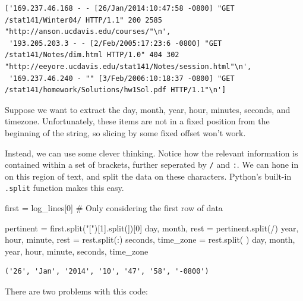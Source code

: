 \documentclass[
  letterpaper,
  DIV=11,
  numbers=noendperiod]{scrreprt}
\newenvironment{Shaded}{\begin{snugshade}}{\end{snugshade}}
\newcommand{\CommentTok}[1]{\textcolor[rgb]{0.37,0.37,0.37}{#1}}
\newcommand{\DecValTok}[1]{\textcolor[rgb]{0.68,0.00,0.00}{#1}}
\newcommand{\NormalTok}[1]{\textcolor[rgb]{0.00,0.23,0.31}{#1}}
\newcommand{\OperatorTok}[1]{\textcolor[rgb]{0.37,0.37,0.37}{#1}}
\newcommand{\StringTok}[1]{\textcolor[rgb]{0.13,0.47,0.30}{#1}}
\begin{document}
\begin{verbatim}
['169.237.46.168 - - [26/Jan/2014:10:47:58 -0800] "GET /stat141/Winter04/ HTTP/1.1" 200 2585 "http://anson.ucdavis.edu/courses/"\n',
 '193.205.203.3 - - [2/Feb/2005:17:23:6 -0800] "GET /stat141/Notes/dim.html HTTP/1.0" 404 302 "http://eeyore.ucdavis.edu/stat141/Notes/session.html"\n',
 '169.237.46.240 - "" [3/Feb/2006:10:18:37 -0800] "GET /stat141/homework/Solutions/hw1Sol.pdf HTTP/1.1"\n']
\end{verbatim}

Suppose we want to extract the day, month, year, hour, minutes, seconds,
and timezone. Unfortunately, these items are not in a fixed position
from the beginning of the string, so slicing by some fixed offset won't
work.

Instead, we can use some clever thinking. Notice how the relevant
information is contained within a set of brackets, further seperated by
\texttt{/} and \texttt{:}. We can hone in on this region of text, and
split the data on these characters. Python's built-in \texttt{.split}
function makes this easy.

\begin{Shaded}
\begin{Highlighting}[]
\NormalTok{first }\OperatorTok{=}\NormalTok{ log\_lines[}\DecValTok{0}\NormalTok{] }\CommentTok{\# Only considering the first row of data}

\NormalTok{pertinent }\OperatorTok{=}\NormalTok{ first.split(}\StringTok{"["}\NormalTok{)[}\DecValTok{1}\NormalTok{].split(}\StringTok{\textquotesingle{}]\textquotesingle{}}\NormalTok{)[}\DecValTok{0}\NormalTok{]}
\NormalTok{day, month, rest }\OperatorTok{=}\NormalTok{ pertinent.split(}\StringTok{\textquotesingle{}/\textquotesingle{}}\NormalTok{)}
\NormalTok{year, hour, minute, rest }\OperatorTok{=}\NormalTok{ rest.split(}\StringTok{\textquotesingle{}:\textquotesingle{}}\NormalTok{)}
\NormalTok{seconds, time\_zone }\OperatorTok{=}\NormalTok{ rest.split(}\StringTok{\textquotesingle{} \textquotesingle{}}\NormalTok{)}
\NormalTok{day, month, year, hour, minute, seconds, time\_zone}
\end{Highlighting}
\end{Shaded}

\begin{verbatim}
('26', 'Jan', '2014', '10', '47', '58', '-0800')
\end{verbatim}

There are two problems with this code:
\end{document}
